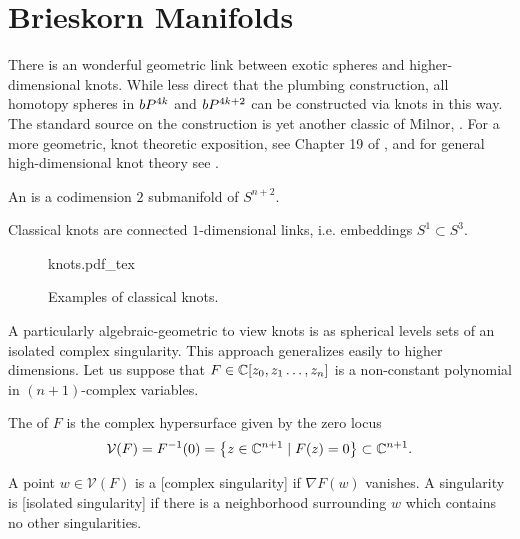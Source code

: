 \newcommand{\V}{\mathcal{V}}
\renewcommand{\L}{\mathcal{L}}

\section{Brieskorn Manifolds}\label{sec:brieskorn}

There is an wonderful geometric link between exotic spheres and higher-dimensional knots. While less direct that the plumbing construction, all homotopy spheres in $bP^{4k}$ and $bP^{4k+2}$ can be constructed via knots in this way. The standard source on the construction is yet another classic of Milnor, \cite{milnor1968hypersurfaces}. For a more geometric, knot theoretic exposition, see Chapter 19 of \cite{kauffman1987knots}, and for general high-dimensional knot theory see \cite{ranicki1998knot}.

\begin{definition}
  An  is a codimension $2$ submanifold of $S^{n+2}$.
\end{definition}

\begin{remark*}
	Classical knots are connected $1$-dimensional links, i.e. embeddings $S^1\subset S^3$. 
\end{remark*}

\begin{figure}[ht]
	\centering
	{knots.pdf_tex}
	\caption{Examples of classical knots.}
\end{figure}

A particularly algebraic-geometric to view knots is as spherical levels sets of an isolated complex singularity. This approach generalizes easily to higher dimensions. Let us suppose that $F\in \mathbb{C}[z_0,z_1\ldots, z_n]$ is a non-constant polynomial in $(n+1)$-complex variables.
\begin{definition}
	The  of $F$ is the complex hypersurface given by the zero locus
	\[
		\V(F) = F^{-1}(0)=\left\{ z \in \C^{n+1} \mid F(z)=0\right\} \subset \C^{n+1}.
	\]
\end{definition}

\begin{definition}
	A point $w\in \V(F)$ is a [complex singularity] if $\nabla F(w)$ vanishes. A singularity is [isolated singularity] if there is a neighborhood surrounding $w$ which contains no other singularities.
\end{definition}

